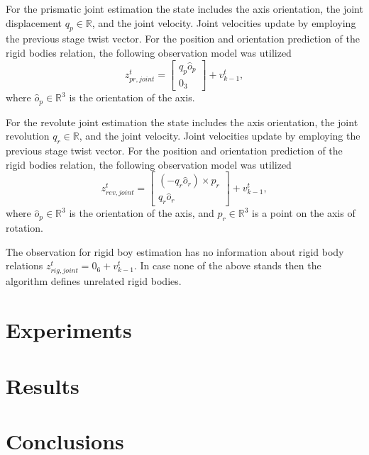 \documentclass[letterpaper, 10 pt, conference]{ieeeconf}
\begin{document}
For the prismatic joint estimation the state includes the axis orientation, the joint displacement $q_p \in \mathbb{R}$, and the joint velocity. Joint velocities update by employing the previous stage twist vector. For the position and orientation prediction of the rigid bodies relation, the following observation model was utilized
\begin{equation}
z_{pr, joint}^t=\begin{bmatrix}
q_p \hat{o}_p\\
0_3 
\end{bmatrix} + v_{k-1}^t,
\end{equation}
where $\hat{o}_p \in \mathbb{R}^3$ is the orientation of the axis.

For the revolute joint estimation the state includes the axis orientation, the joint revolution $q_r \in \mathbb{R}$, and the joint velocity. Joint velocities update by employing the previous stage twist vector. For the position and orientation prediction of the rigid bodies relation, the following observation model was utilized
\begin{equation}
z_{rev, joint}^t=\begin{bmatrix}
(-q_r \hat{o}_r) \times p_r\\
q_r \hat{o}_r
\end{bmatrix} + v_{k-1}^t,
\end{equation}
where $\hat{o}_p \in \mathbb{R}^3$ is the orientation of the axis, and $p_r \in \mathbb{R}^3$ is a point on the axis of rotation.

The observation for rigid boy estimation has no information about rigid body relations $z_{rig, joint}^t = 0_6 + v_{k-1}^t$. In case none of the above stands then the algorithm defines unrelated rigid bodies.














\section{Experiments}\label{experim}

\section{Results}\label{resul}

\section{Conclusions}\label{concl}



\end{document}
